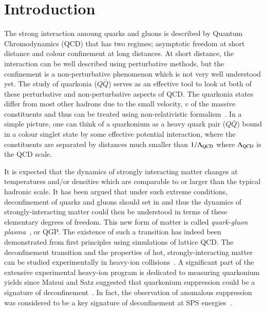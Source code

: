 \section{Introduction}
\label{sec:Introduction}


The strong interaction amoung quarks and gluons is described by
Quantum Chromodynamics (QCD) that has two regimes; asymptotic freedom at short distance
and colour confinement at long distances.
At short distance, the interaction can be well described using perturbative methods,
but the confinement is a non-perturbative phenomenon which is not very
well understood yet. 
 The study of quarkonia ($Q\bar{Q}$) serves as an effective 
tool to look at  both of these perturbative and non-perturbative aspects of QCD.
The quarkonia states differ from most other hadrons due to the small velocity, $v$ of the massive
constituents and thus can be treated using non-relativistic formalism~\cite{Povh:1995mua,Ikhdair:2005jf}. 
In a simple picture, one can think of a quarkonium as a heavy quark pair ($Q\bar{Q}$) bound
in a colour singlet state by some effective potential interaction, where the constituents are 
separated by distances much smaller than $1/\Lambda_{\rm QCD}$ where $\Lambda_{\rm QCD}$
is the QCD scale.


It is expected that the dynamics of strongly interacting matter changes
at temperatures and/or densities which are comparable to or larger than
the typical hadronic scale.
It has been argued that under such extreme conditions, 
deconfinement of quarks and gluons should set in and thus the 
dynamics of strongly-interacting matter could then
be understood in terms of these elementary degrees of freedom.
This new form of matter is called
{\em quark-gluon plasma}~\cite{Shuryak:1980tp,Satz:2011wf}, or QGP.
The existence of such a transition has indeed been demonstrated 
from first principles using simulations of lattice QCD.
 The deconfinement transition and the properties of hot, strongly-interacting 
matter can be studied experimentally in heavy-ion collisions~\cite{Satz:2000bn}. 
A significant part of the extensive experimental heavy-ion
program is dedicated to measuring quarkonium yields since Matsui and Satz
suggested that quarkonium suppression could be a signature of 
deconfinement~\cite{Matsui:1986dk}.
In fact, the observation of anomalous suppression was considered to be
a key signature of deconfinement at SPS energies~\cite{Kluberg:2005yh}.




